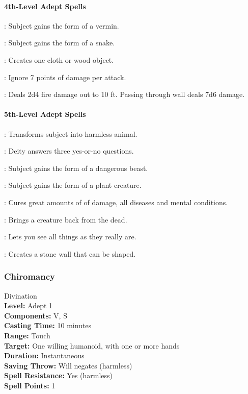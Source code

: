 \paragraph{4th-Level Adept Spells}
\begin{list}{}{\leftmargin=1em}
 \item {}: Subject gains the form of a vermin.
 \item {}: Subject gains the form of a snake.
 \item {}: Creates one cloth or wood object.
 \item {}: Ignore 7 points of damage per attack.
 \item {}: Deals 2d4 fire damage out to 10 ft. Passing through wall deals 7d6 damage.
\end{list}
\paragraph{5th-Level Adept Spells}
\begin{list}{}{\leftmargin=1em}
 \item {}: Transforms subject into harmless animal.
 \item {}: Deity answers three yes-or-no questions.
 \item {}: Subject gains the form of a dangerous beast.
 \item {}: Subject gains the form of a plant creature.
 \item {}: Cures great amounts of of damage, all diseases and mental conditions.
 \item {}: Brings a creature back from the dead.
 \item {}: Lets you see all things as they really are.
 \item {}: Creates a stone wall that can be shaped.
\end{list}

\subsubsection{Chiromancy}
\label{Spell:Chiromancy}
Divination
\\ \textbf{Level:} Adept 1
\\ \textbf{Components:} V, S
\\ \textbf{Casting Time:} 10 minutes
\\ \textbf{Range:} Touch
\\ \textbf{Target:} One willing humanoid, with one or more hands
\\ \textbf{Duration:} Instantaneous
\\ \textbf{Saving Throw:} Will negates (harmless)
\\ \textbf{Spell Resistance:} Yes (harmless)
\\ \textbf{Spell Points:} 1

